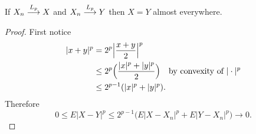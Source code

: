 \begin{theorem}
If $X_n\overset{\small L_p} \longrightarrow X$ and  $X_n\overset{\small L_p} \longrightarrow Y$ then  $X=Y$  almost everywhere.
\end{theorem}
\begin{proof}
First notice 
\begin{align}
|x+y|^p &= 2^p \Bigl| \frac{x+y}{2} \Bigr|^p \nonumber \\
&\leq 2^p \Bigl(\frac{|x|^p + |y|^p}{2} \Bigr)\quad\text{by convexity of $|\cdot|^p$} \nonumber \\
& \leq 2^{p-1} (|x|^p + |y|^p). \label{convex ineq for normp}
\end{align}
Therefore 
 \begin{equation}
 \label{convex ineq for normp 2} 
 0\leq E|X-Y|^p\leq 2^{p-1}\bigl(E|X-X_n|^p + E|Y-X_n|^p\bigr)\rightarrow 0.
 \end{equation}

\end{proof}


